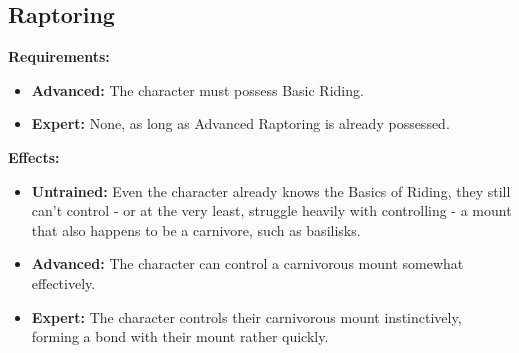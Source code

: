 \subsection{Raptoring}
\begin{table}[!ht]
\centering
{}
\end{table}
\textbf{Requirements:}
\begin{itemize}
	\item \textbf{Advanced:} The character must possess Basic Riding.
	\item \textbf{Expert:} None, as long as Advanced Raptoring is already possessed.
\end{itemize}
\textbf{Effects:}
\begin{itemize}
	\item \textbf{Untrained:} Even the character already knows the Basics of Riding, they still can't control - or at the very least, struggle heavily with controlling - a mount that also happens to be a carnivore, such as basilisks.
	\item \textbf{Advanced:} The character can control a carnivorous mount somewhat effectively.
	\item \textbf{Expert:} The character controls their carnivorous mount instinctively, forming a bond with their mount rather quickly.
\end{itemize}\newpage
